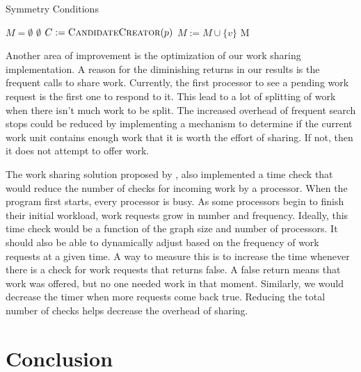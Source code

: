\documentclass[12pt,twoside]{reedthesis}
\begin{document}
\begin{algorithm}
\caption{Symmetry Conditions} \label{alg:sc}
 \begin{algorithmic}[1]
\State $M = \emptyset$
  
 \State \Return $\emptyset	$			
\EndIf
\State $C := \Call{CandidateCreator}{p}$
        \State $M := M \cup \{v\}$
    \EndIf
\EndFor
\State \Return M
\EndFunction
\end{algorithmic}
\end{algorithm}
 
 Another area of improvement is the optimization of our work sharing implementation. A reason for the diminishing returns in our results is the frequent calls to share work. Currently, the first processor to see a pending work request is the first one to respond to it. This lead to a lot of splitting of work when there isn't much work to be split. The increased overhead of frequent search stops could be reduced by implementing a mechanism to determine if the current work unit contains enough work that it is worth the effort of sharing. If not, then it does not attempt to offer work.
 
The work sharing solution proposed by \citeauthor{par_t} \cite{par_t}, also implemented a time check that would reduce the number of checks for incoming work by a processor. When the program first starts, every processor is busy. As some processors begin to finish their initial workload, work requests grow in number and frequency. Ideally, this time check would be a function of the graph size and number of processors. It should also be able to dynamically adjust based on the frequency of work requests at a given time. A way to measure this is to increase the time whenever there is a check for work requests that returns false. A false return means that work was offered, but no one needed work in that moment. Similarly, we would decrease the timer when more requests come back true. Reducing the total number of checks helps decrease the overhead of sharing.

\section{Conclusion}
\end{document}
